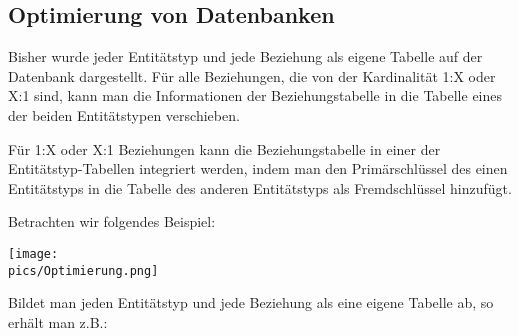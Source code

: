 \subsection[Optimierung]{Optimierung von Datenbanken}
Bisher wurde jeder Entitätstyp und jede Beziehung als eigene Tabelle auf der Datenbank dargestellt. Für alle Beziehungen, die von der Kardinalität 1:X oder X:1 sind, kann man die Informationen der Beziehungstabelle in die Tabelle eines der beiden Entitätstypen verschieben.
\begin{tcolorbox}[title=Optimierung]
	Für 1:X oder X:1 Beziehungen kann die Beziehungstabelle in einer der Entitätstyp-Tabellen integriert werden, indem man den Primärschlüssel des einen Entitätstyps in die Tabelle des anderen Entitätstyps als Fremdschlüssel hinzufügt.
\end{tcolorbox}
Betrachten wir folgendes Beispiel:
\begin{minipage}{\textwidth}
	\centering\texttt{[image: \\pics/Optimierung.png]}
\end{minipage}

Bildet man jeden Entitätstyp und jede Beziehung als eine eigene Tabelle ab, so erhält man z.B.:

\medskip

